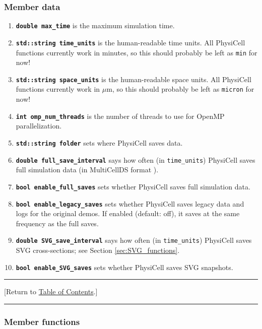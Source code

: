 \documentclass[12pt]{article}
\newcommand{\micron}{\mu\textrm{m}}
\renewcommand{\v}{\verb}
\newcommand{\smallcode}[1]{\textbf{\texttt{#1}}}
\newcommand{\TOClink}{\begin{center}\hrule\vskip-10pt\phantom{.}\hfill[Return to \hyperlink{TOC}{Table of Contents}.]\hfill\phantom{.}\vskip3pt\hrule\end{center}}
\begin{document}
\subsubsection{Member data}
\begin{enumerate}
\item 
\smallcode{double max\_time} is the maximum simulation time. 

\item 
\smallcode{std::string time\_units} is the human-readable time units. 
All PhysiCell functions currently work in minutes, so this should 
probably be left as \v|min| for now!

\item 
\smallcode{std::string space\_units} is the human-readable space units. 
All PhysiCell functions currently work in $\micron$, so this should 
probably be left as \v|micron| for now!

\item 
\smallcode{int omp\_num\_threads} is the number of threads to 
use for OpenMP parallelization. 

\item 
\smallcode{std::string folder} sets where PhysiCell saves data. 

\item 
\smallcode{double full\_save\_interval} says how often (in \v|time_units|) 
PhysiCell saves full simulation data (in MultiCellDS format \cite{ref:MultiCellDS}). 

\item 
\smallcode{bool enable\_full\_saves} sets whether PhysiCell saves 
full simulation data. 

\item 
\smallcode{bool enable\_legacy\_saves} sets whether PhysiCell saves 
legacy data and logs for the original demos. If enabled (default: off), 
it saves at the same frequency as the full saves. 

\item 
\smallcode{double SVG\_save\_interval} says how often (in \v|time_units|) 
PhysiCell saves SVG cross-sections; see Section \ref{sec:SVG_functions}. 

\item 
\smallcode{bool enable\_SVG\_saves} sets whether PhysiCell saves 
SVG snapshots.  
\end{enumerate}

\TOClink 

\subsubsection{Member functions}
\end{document}
